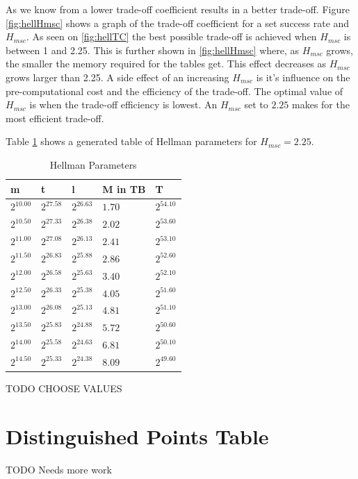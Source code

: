 As we know from \cite{176} a lower trade-off coefficient results in a
better trade-off. Figure \ref{fig:hellHmsc} shows a graph of the
trade-off coefficient for a set success rate and $H_{msc}$.
As seen on \ref{fig:hellTC} the best possible trade-off is achieved
when $H_{msc}$ is between 1 and 2.25. This is further shown in
\ref{fig:hellHmsc} where, as $H_{msc}$ grows, the smaller the memory
required for the tables get. This effect decreases as $H_{msc}$ grows
larger than 2.25. A side effect of an increasing $H_{msc}$ is it's
influence on the pre-computational cost and the efficiency of the
trade-off. The optimal value of $H_{msc}$ is when the trade-off
efficiency is lowest. An $H_{msc}$ set to $2.25$ makes for the most
efficient trade-off.

Table \ref{tab:hellparam} shows a generated table of Hellman
parameters for $H_{msc} =2.25$.
\begin{table}[H]
  \centering
\begin{tabular}{lllll}
m & t & l & M in TB & T \\\hline
$2^{10.00}$ & $2^{27.58}$ & $2^{26.63}$ & $1.70$ & $2^{54.10}$ \\
$2^{10.50}$ & $2^{27.33}$ & $2^{26.38}$ & $2.02$ & $2^{53.60}$ \\
$2^{11.00}$ & $2^{27.08}$ & $2^{26.13}$ & $2.41$ & $2^{53.10}$ \\
$2^{11.50}$ & $2^{26.83}$ & $2^{25.88}$ & $2.86$ & $2^{52.60}$ \\
$2^{12.00}$ & $2^{26.58}$ & $2^{25.63}$ & $3.40$ & $2^{52.10}$ \\
$2^{12.50}$ & $2^{26.33}$ & $2^{25.38}$ & $4.05$ & $2^{51.60}$ \\
$2^{13.00}$ & $2^{26.08}$ & $2^{25.13}$ & $4.81$ & $2^{51.10}$ \\
$2^{13.50}$ & $2^{25.83}$ & $2^{24.88}$ & $5.72$ & $2^{50.60}$ \\
$2^{14.00}$ & $2^{25.58}$ & $2^{24.63}$ & $6.81$ & $2^{50.10}$ \\
$2^{14.50}$ & $2^{25.33}$ & $2^{24.38}$ & $8.09$ & $2^{49.60}$ \\
\end{tabular}
  \caption{Hellman Parameters}
  \label{tab:hellparam}
\end{table}

TODO CHOOSE VALUES

\section{Distinguished Points Table}
TODO Needs more work

